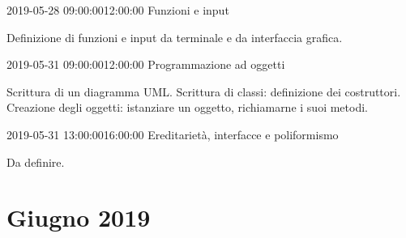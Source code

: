 \documentclass[twoside, symmetric]{tufte-book}
\begin{document}
\begin{lezione}
	{2019-05-28}
	{09:00:00}{12:00:00}
	{Funzioni e input}

Definizione di funzioni e input da terminale e da interfaccia grafica.

\end{lezione}

\begin{lezione}
	{2019-05-31}
	{09:00:00}{12:00:00}
	{Programmazione ad oggetti}

Scrittura di un diagramma UML.
Scrittura di classi: definizione dei costruttori.
Creazione degli oggetti: istanziare un oggetto, richiamarne i suoi metodi.

\end{lezione}

\begin{lezione}
	{2019-05-31}
	{13:00:00}{16:00:00}
	{Ereditarietà, interfacce e poliformismo}

Da definire.

\end{lezione}

\clearpage
\section*{Giugno 2019}
\end{document}
